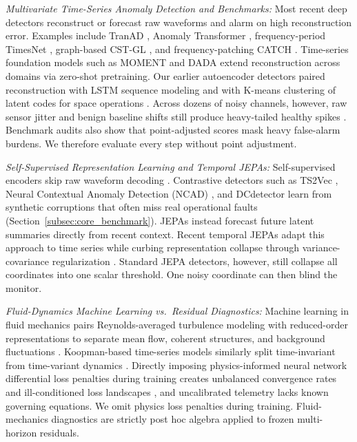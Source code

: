 \documentclass[journal]{IEEEtran}
\begin{document}
\noindent\emph{Multivariate Time-Series Anomaly Detection and Benchmarks:} Most recent deep detectors reconstruct or forecast raw waveforms and alarm on high reconstruction error. Examples include TranAD \cite{tuli2022tranad}, Anomaly Transformer \cite{xu2022anomaly}, frequency-period TimesNet \cite{wu2023timesnet}, graph-based CST-GL \cite{zheng2024cstgl}, and frequency-patching CATCH \cite{wu2025catch}. Time-series foundation models such as MOMENT \cite{goswami2024moment} and DADA \cite{shentu2025dada} extend reconstruction across domains via zero-shot pretraining. Our earlier autoencoder detectors paired reconstruction with LSTM sequence modeling \cite{akbarian2023aelstm} and with K-means clustering of latent codes for space operations \cite{akbarian2024aekmeans}. Across dozens of noisy channels, however, raw sensor jitter and benign baseline shifts still produce heavy-tailed healthy spikes \cite{schmidl2022anomaly}. Benchmark audits \cite{kim2022towards, wu2023flawed, liu2024tsbad, zhou2026mtsbench} also show that point-adjusted scores mask heavy false-alarm burdens. We therefore evaluate every step without point adjustment.

\noindent\emph{Self-Supervised Representation Learning and Temporal JEPAs:} Self-supervised encoders skip raw waveform decoding \cite{zhang2023self}. Contrastive detectors such as TS2Vec \cite{yue2022ts2vec}, Neural Contextual Anomaly Detection (NCAD) \cite{carmona2021neural}, and DCdetector \cite{yang2023dcdetector} learn from synthetic corruptions that often miss real operational faults (Section~\ref{subsec:core_benchmark}). JEPAs \cite{lecun2022path, assran2023self, bardes2024vjepa} instead forecast future latent summaries directly from recent context. Recent temporal JEPAs \cite{ennadir2025tsjepa} adapt this approach to time series while curbing representation collapse through variance-covariance regularization \cite{bardes2021vicreg, garrido2023rankme}. Standard JEPA detectors, however, still collapse all coordinates into one scalar threshold. One noisy coordinate can then blind the monitor.

\noindent\emph{Fluid-Dynamics Machine Learning vs.\ Residual Diagnostics:} Machine learning in fluid mechanics pairs Reynolds-averaged turbulence modeling with reduced-order representations to separate mean flow, coherent structures, and background fluctuations \cite{vinuesa2022enhancing}. Koopman-based time-series models similarly split time-invariant from time-variant dynamics \cite{liu2023koopa}. Directly imposing physics-informed neural network differential loss penalties during training creates unbalanced convergence rates \cite{wang2022pinns} and ill-conditioned loss landscapes \cite{rathore2024challenges}, and uncalibrated telemetry lacks known governing equations. We omit physics loss penalties during training. Fluid-mechanics diagnostics are strictly post hoc algebra applied to frozen multi-horizon residuals.
\end{document}

